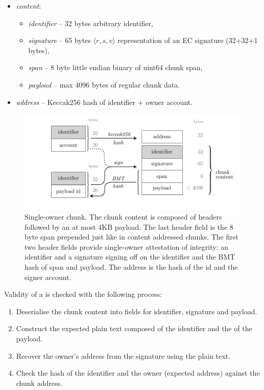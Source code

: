 \begin{itemize}
    \item \emph{content}: 
\begin{itemize}
    \item \emph{identifier} -- 32 bytes arbitrary identifier, 
    \item \emph{signature} -- 65 bytes $\langle r,s,v \rangle$ representation of an EC signature (32+32+1 bytes),
    \item \emph{span} -- 8 byte little endian binary of uint64 chunk span,
    \item \emph{payload} -- max 4096 bytes of regular chunk data.
\end{itemize}
    \item \emph{address} -- Keccak256 hash of identifier + owner account.
\end{itemize}

\begin{figure}[htbp]
   \centering
   \includegraphics[width=\textwidth]{fig/single-owner-chunk.pdf}
   \caption[Single-owner chunk\statusgreen]{Single-owner chunk. The chunk content is composed of headers followed by an at most 4KB payload. The last header field is the 8 byte span prepended just like in content addressed chunks. The first two header fields provide single-owner attestation of integrity: an identifier and a signature signing off on the identifier and the BMT hash of span and payload. The address is the hash of the id and the signer account.}
   \label{fig:single-owner-chunks}
\end{figure}

Validity of a  is checked with the following process:

\begin{enumerate}
    \item Deserialise the chunk content into fields for identifier, signature and payload.
    \item Construct the expected plain text composed of the identifier and the  of the payload.
    \item Recover the owner's address from the signature using the plain text.
    \item Check the hash of the identifier and the owner (expected address) against the chunk address.
\end{enumerate}

